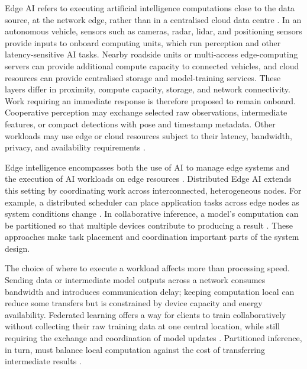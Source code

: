 \documentclass[12pt,a4paper,oneside]{report}
\begin{document}
Edge AI refers to executing artificial intelligence computations close to
the data source, at the network edge, rather than in a centralised cloud data
centre \cite{deng2020}. In an autonomous vehicle, sensors such as cameras,
radar, lidar, and positioning sensors provide inputs to onboard computing
units, which run perception and other latency-sensitive AI tasks. Nearby
roadside units or multi-access edge-computing servers can provide additional
compute capacity to connected vehicles, and cloud resources can provide
centralised storage and model-training services. These layers differ in
proximity, compute capacity, storage, and network connectivity. Work requiring an immediate response is therefore proposed to remain
onboard. Cooperative perception may exchange selected raw observations,
intermediate features, or compact detections with pose and timestamp
metadata. Other workloads may use edge or cloud resources subject to their
latency, bandwidth, privacy, and availability requirements
\cite{biswas2023}.

Edge intelligence encompasses both the use of AI to manage edge systems and
the execution of AI workloads on edge resources \cite{deng2020}. Distributed
Edge AI extends this setting by coordinating work across interconnected,
heterogeneous nodes. For example, a distributed scheduler can place
application tasks across edge nodes as system conditions change
\cite{hu2023}. In collaborative inference, a model's computation can be
partitioned so that multiple devices contribute to producing a result
\cite{hou2022}. These approaches make task placement and coordination
important parts of the system design.

The choice of where to execute a workload affects more than processing
speed. Sending data or intermediate model outputs across a network consumes
bandwidth and introduces communication delay; keeping computation local can
reduce some transfers but is constrained by device capacity and energy
availability. Federated learning offers a way for clients to train
collaboratively without collecting their raw training data at one central
location, while still requiring the exchange and coordination of model
updates \cite{deng2020}. Partitioned inference, in turn, must balance local
computation against the cost of transferring intermediate results
\cite{hou2022}.
\end{document}
